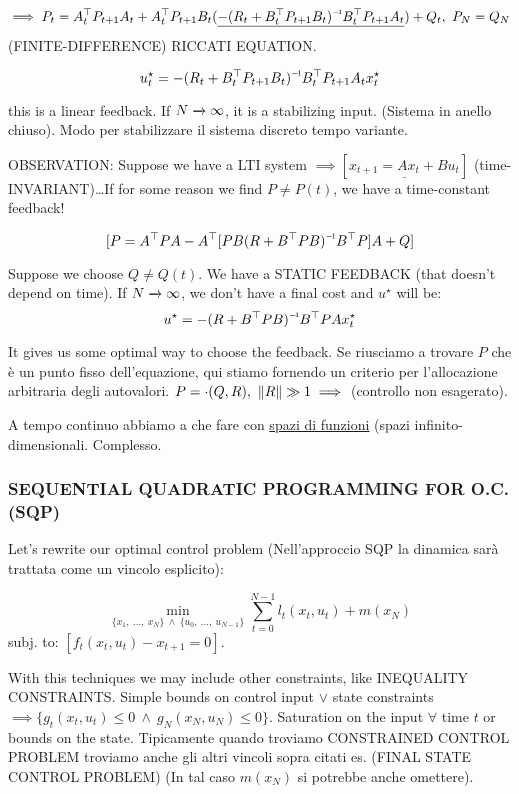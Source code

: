 \[
	\implies P_t = A_t^\top P_{t+1}A_t + A_t^\top P_{t+1}B_t(\underline{-\inv{(R_t + B_t^\top P_{t+1}B_t)}B_t^\top P_{t+1}A_t}) + Q_t,\ P_N = Q_N
\]
(FINITE-DIFFERENCE) RICCATI EQUATION.

\[
	u_t^\star = -\inv{(R_t + B_t^\top P_{t+1}B_t)}B_t^\top P_{t+1}A_tx_t^\star
\]

this is a linear feedback. If $N\tendsto{}\infty$, it is a stabilizing input. (Sistema in anello chiuso). Modo per stabilizzare il sistema discreto tempo variante.

OBSERVATION: Suppose we have a LTI system $\implies [\underline{x_{t+1}=Ax_t + Bu_t}]$\newline
(time-INVARIANT)\dots If for some reason we find $P\neq P(t)$, we have a time-constant feedback!

\[	
	[P=A^\top PA -A^\top [PB\inv{(R+B^\top PB)}B^\top P]A + Q]
\]

Suppose we choose $Q\neq Q(t)$. We have a STATIC FEEDBACK (that doesn't depend on time). If $N\tendsto{}\infty$, we don't have a final cost and $u^\star$ will be:
\[
	u^\star = -\inv{(R+B^\top PB)}B^\top PAx_t^\star
\]

It gives us some optimal way to choose the feedback.
Se riusciamo a trovare $P$ che è un punto fisso dell'equazione, qui stiamo fornendo un criterio per l'allocazione arbitraria degli autovalori. $P = \mathord{\cdot}(Q,R),\ \lVert R\rVert\gg 1 \implies$ (controllo non esagerato).

A tempo continuo abbiamo a che fare con \underline{spazi di funzioni} (spazi infinito-dimensionali. Complesso.

\subsubsection{SEQUENTIAL QUADRATIC PROGRAMMING FOR O.C. (SQP)}

Let's rewrite our optimal control problem (Nell'approccio SQP la dinamica sarà trattata come un vincolo esplicito):

\[
	\min_{\{x_1,\ \dots,\ x_N\}\ \land\ \{u_0,\ \dots,\ u_{N-1}\}}{\sum_{t=0}^{N-1}{l_t(x_t,u_t)} + m(x_N)}
\]
subj. to: $[f_t(x_t,u_t) - x_{t+1} = 0]$.

With this techniques we may include other constraints, like INEQUALITY CONSTRAINTS. Simple bounds on control input $\lor$ state constraints $\implies \{g_t(x_t,u_t)\leq 0\ \land\ g_N(x_N,u_N)\leq 0\}$. Saturation on the input $\forall$ time $t$ or bounds on the state. Tipicamente quando troviamo CONSTRAINED CONTROL PROBLEM troviamo anche gli altri vincoli sopra citati es. (FINAL STATE CONTROL PROBLEM) (In tal caso $m(x_N)$ si potrebbe anche omettere).

